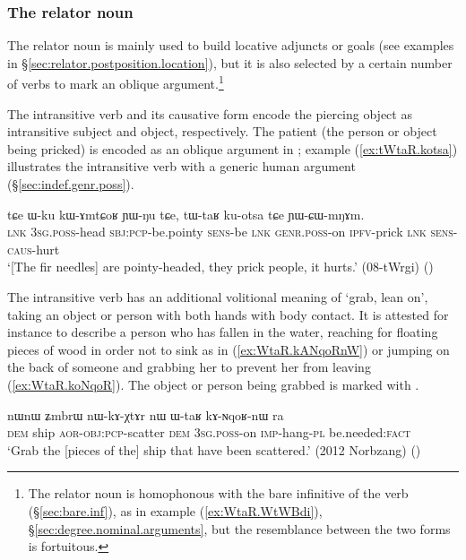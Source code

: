 \subsubsection{The relator noun } \label{sec:WtaR} 
The relator noun  is mainly used to build locative adjuncts or goals (see examples in §\ref{sec:relator.postposition.location}), but it is also selected by a certain number of verbs to mark an oblique argument.\footnote{The relator noun  is homophonous with the bare infinitive  of the verb  (§\ref{sec:bare.inf}), as in example (\ref{ex:WtaR.WtWBdi}), §\ref{sec:degree.nominal.arguments}, but the resemblance between the two forms is fortuitous. }

The intransitive verb  and its causative form  encode the piercing object as intransitive subject and object, respectively. The patient (the person or object being pricked) is encoded as an oblique argument in ; example (\ref{ex:tWtaR.kotsa}) illustrates the intransitive verb  with a generic human argument (§\ref{sec:indef.genr.poss}).

\begin{exe}
\ex \label{ex:tWtaR.kotsa}
\gll tɕe ɯ-ku kɯ-ɤmtɕoʁ ɲɯ-ŋu tɕe, tɯ-taʁ ku-otsa tɕe ɲɯ-ɕɯ-mŋɤm. \\
\textsc{lnk} \textsc{3sg}.\textsc{poss}-head \textsc{sbj}:\textsc{pcp}-be.pointy \textsc{sens}-be \textsc{lnk} \textsc{genr}.\textsc{poss}-on \textsc{ipfv}-prick \textsc{lnk} \textsc{sens}-\textsc{caus}-hurt \\
\glt `[The fir needles] are pointy-headed, they prick people, it hurts.'  (08-tWrgi) ()
\end{exe} 

The intransitive verb  has an additional volitional meaning of `grab, lean on', taking an object or person with both hands with body contact. It is attested for instance to describe a person who has fallen in the water, reaching for floating pieces of wood in order not to sink as in (\ref{ex:WtaR.kANqoRnW}) or jumping on the back of someone and grabbing her to prevent her from leaving (\ref{ex:WtaR.koNqoR}). The object or person being grabbed is marked with .

\begin{exe}
\ex \label{ex:WtaR.kANqoRnW}
 \gll nɯnɯ ʑmbrɯ nɯ-kɤ-χtɤr nɯ ɯ-taʁ kɤ-ɴqoʁ-nɯ ra   \\
 \textsc{dem} ship \textsc{aor}-\textsc{obj}:\textsc{pcp}-scatter \textsc{dem} \textsc{3sg}.\textsc{poss}-on \textsc{imp}-hang-\textsc{pl} be.needed:\textsc{fact} \\
 \glt `Grab the [pieces of the] ship that have been scattered.' (2012 Norbzang)
()
\end{exe}

